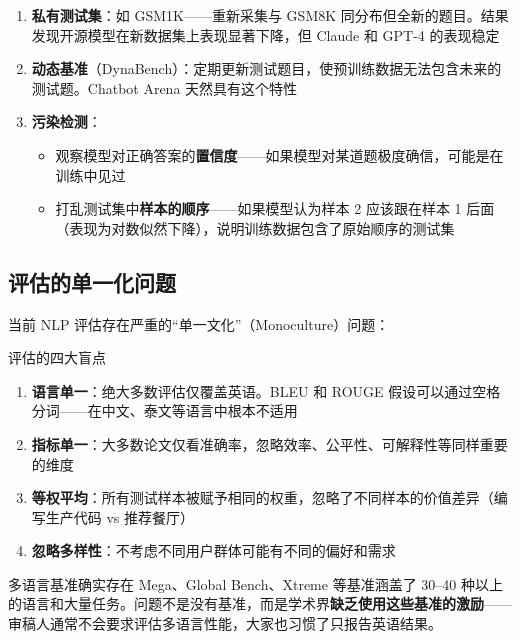 \documentclass[a4paper]{article}
\begin{document}



\begin{enumerate}
    \item \textbf{私有测试集}：如 GSM1K——重新采集与 GSM8K 同分布但全新的题目。结果发现开源模型在新数据集上表现显著下降，但 Claude 和 GPT-4 的表现稳定
    \item \textbf{动态基准}（DynaBench）：定期更新测试题目，使预训练数据无法包含未来的测试题。Chatbot Arena 天然具有这个特性
    \item \textbf{污染检测}：
    \begin{itemize}
        \item 观察模型对正确答案的\textbf{置信度}——如果模型对某道题极度确信，可能是在训练中见过
        \item 打乱测试集中\textbf{样本的顺序}——如果模型认为样本 2 应该跟在样本 1 后面（表现为对数似然下降），说明训练数据包含了原始顺序的测试集
    \end{itemize}
\end{enumerate}

\subsection{评估的单一化问题}





当前 NLP 评估存在严重的``单一文化''（Monoculture）问题：

\begin{warningbox}{评估的四大盲点}
\begin{enumerate}
    \item \textbf{语言单一}：绝大多数评估仅覆盖英语。BLEU 和 ROUGE 假设可以通过空格分词——在中文、泰文等语言中根本不适用
    \item \textbf{指标单一}：大多数论文仅看准确率，忽略效率、公平性、可解释性等同样重要的维度
    \item \textbf{等权平均}：所有测试样本被赋予相同的权重，忽略了不同样本的价值差异（编写生产代码 vs 推荐餐厅）
    \item \textbf{忽略多样性}：不考虑不同用户群体可能有不同的偏好和需求
\end{enumerate}
\end{warningbox}

\begin{knowledgebox}{多语言基准确实存在}
Mega、Global Bench、Xtreme 等基准涵盖了 30--40 种以上的语言和大量任务。问题不是没有基准，而是学术界\textbf{缺乏使用这些基准的激励}——审稿人通常不会要求评估多语言性能，大家也习惯了只报告英语结果。
\end{knowledgebox}
\end{document}
